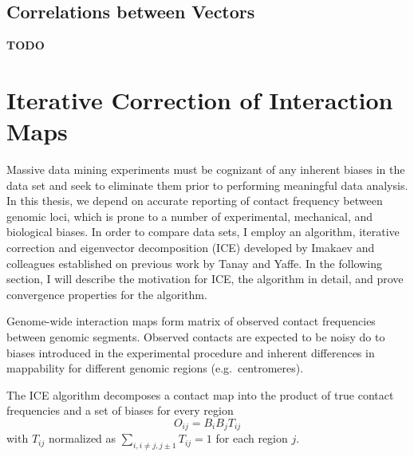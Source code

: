 \subsection*{Correlations between Vectors}

\textbf{TODO}

\section*{Iterative Correction of Interaction Maps}

Massive data mining experiments must be cognizant of any inherent biases in the data set and seek to eliminate them prior to performing
meaningful data analysis.  In this thesis, we depend on accurate reporting of contact frequency between genomic loci, which is prone
to a number of experimental, mechanical, and biological biases\cite{dekker2006}.  In order to compare data sets, I employ an algorithm,
iterative correction and eigenvector decomposition (ICE) developed by Imakaev and colleagues\cite{imakaev2012} established on previous
work by Tanay and Yaffe\cite{yaffe2011}.  In the following section, I will describe the motivation for ICE, the algorithm in detail, and
prove convergence properties for the algorithm.

Genome-wide interaction maps form matrix of observed contact frequencies between genomic segments.  Observed contacts are expected to
be noisy do to biases introduced in the experimental procedure and inherent differences in mappability for different genomic regions
(e.g.\ centromeres).


The ICE algorithm decomposes a contact map into the product of true contact frequencies and a set of biases for every region
\[
  O_{ij} = B_{i}B_{j}T_{ij}
\]
with $T_{ij}$ normalized as $\sum_{i,i \neq j,j \pm 1}T_{ij} = 1$ for each region $j$.
